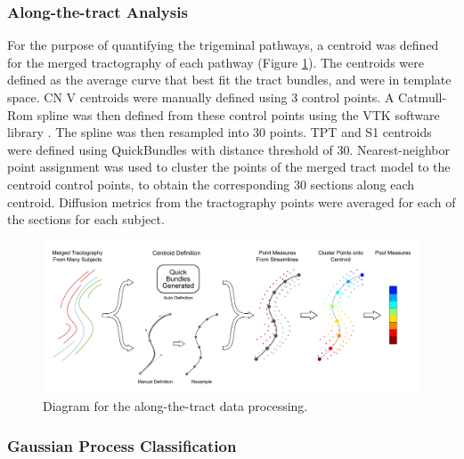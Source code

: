 \subsubsection{Along-the-tract Analysis}
For the purpose of quantifying the trigeminal pathways, a centroid was defined for the merged tractography of each pathway (Figure \ref{fig:GPfigure-method-centroid}). The centroids were defined as the average curve that best fit the tract bundles, and were in template space. CN V centroids were manually defined using 3 control points. A Catmull-Rom spline \cite{DeRose1988} was then defined from these control points using the VTK software library \cite{Schroeder2005}. The spline was then resampled into 30 points. TPT and S1 centroids were defined using QuickBundles \cite{Garyfallidis2012} with distance threshold of 30. Nearest-neighbor point assignment was used to cluster  the points of the merged tract model to the centroid control points, to obtain the corresponding 30 sections along each centroid. Diffusion metrics from the tractography points were averaged for each of the sections for each subject. 

\begin{figure}[ht]
\centering
\includegraphics[width=\linewidth]{thesis/images/tn-gp-sagit/figure-path-analysis.pdf}
\caption{Diagram for the along-the-tract data processing.}
\label{fig:GPfigure-method-centroid}
\end{figure}

\subsubsection{Gaussian Process Classification}

